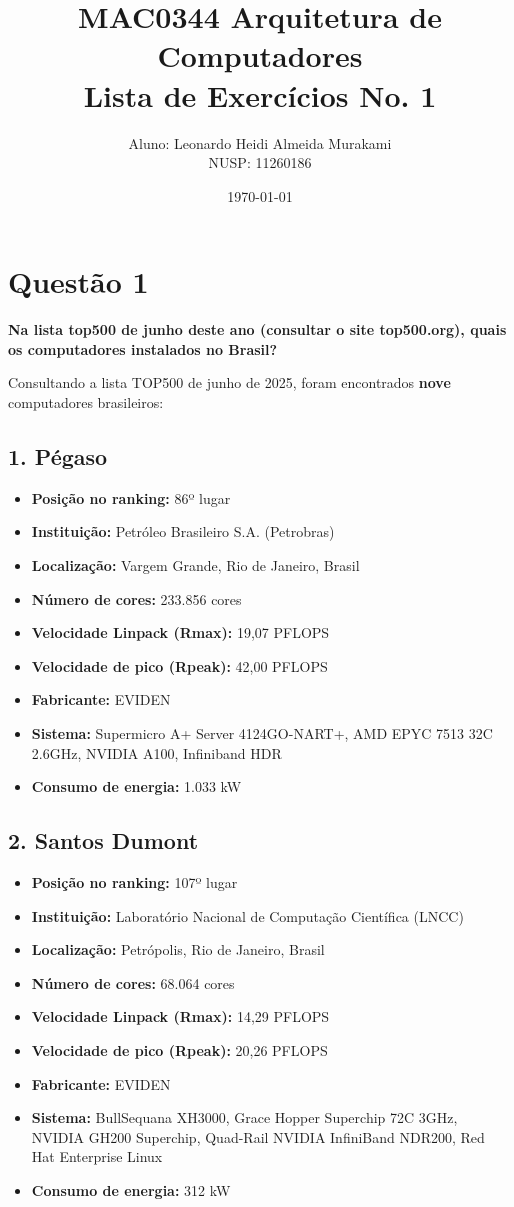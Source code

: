 \documentclass[12pt,a4paper]{article}
\title{MAC0344 Arquitetura de Computadores\\Lista de Exercícios No. 1}
\author{Aluno: Leonardo Heidi Almeida Murakami \\ NUSP: 11260186}
\date{\today}
\begin{document}
\maketitle

\section*{Questão 1}

\textbf{Na lista top500 de junho deste ano (consultar o site top500.org), quais os computadores instalados no Brasil?}

Consultando a lista TOP500 de junho de 2025, foram encontrados \textbf{nove} computadores brasileiros:

\subsection*{1. Pégaso}
\begin{itemize}
    \item \textbf{Posição no ranking:} 86º lugar
    \item \textbf{Instituição:} Petróleo Brasileiro S.A. (Petrobras)
    \item \textbf{Localização:} Vargem Grande, Rio de Janeiro, Brasil
    \item \textbf{Número de cores:} 233.856 cores
    \item \textbf{Velocidade Linpack (Rmax):} 19,07 PFLOPS
    \item \textbf{Velocidade de pico (Rpeak):} 42,00 PFLOPS
    \item \textbf{Fabricante:} EVIDEN
    \item \textbf{Sistema:} Supermicro A+ Server 4124GO-NART+, AMD EPYC 7513 32C 2.6GHz, NVIDIA A100, Infiniband HDR
    \item \textbf{Consumo de energia:} 1.033 kW
\end{itemize}

\newpage
\subsection*{2. Santos Dumont}
\begin{itemize}
    \item \textbf{Posição no ranking:} 107º lugar
    \item \textbf{Instituição:} Laboratório Nacional de Computação Científica (LNCC)
    \item \textbf{Localização:} Petrópolis, Rio de Janeiro, Brasil
    \item \textbf{Número de cores:} 68.064 cores
    \item \textbf{Velocidade Linpack (Rmax):} 14,29 PFLOPS
    \item \textbf{Velocidade de pico (Rpeak):} 20,26 PFLOPS
    \item \textbf{Fabricante:} EVIDEN
    \item \textbf{Sistema:} BullSequana XH3000, Grace Hopper Superchip 72C 3GHz, NVIDIA GH200 Superchip, Quad-Rail NVIDIA InfiniBand NDR200, Red Hat Enterprise Linux
    \item \textbf{Consumo de energia:} 312 kW
\end{itemize}
\end{document}
